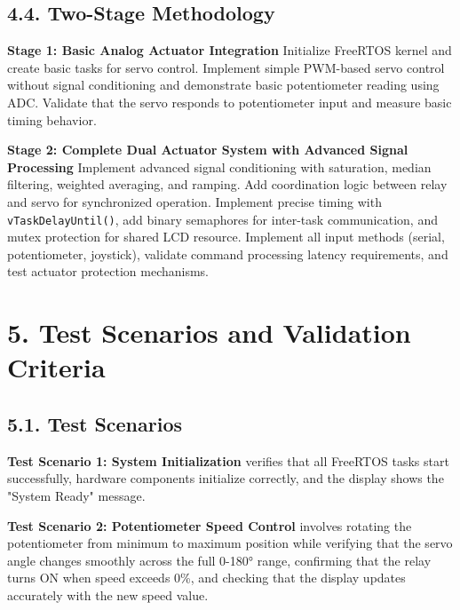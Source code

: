 \documentclass[12pt]{article}
\begin{document}
\subsection*{4.4. Two-Stage Methodology}

\textbf{Stage 1: Basic Analog Actuator Integration}
\newline
Initialize FreeRTOS kernel and create basic tasks for servo control. Implement simple PWM-based servo control without signal conditioning and demonstrate basic potentiometer reading using ADC. Validate that the servo responds to potentiometer input and measure basic timing behavior.

\textbf{Stage 2: Complete Dual Actuator System with Advanced Signal Processing}
\newline
Implement advanced signal conditioning with saturation, median filtering, weighted averaging, and ramping. Add coordination logic between relay and servo for synchronized operation. Implement precise timing with \texttt{vTaskDelayUntil()}, add binary semaphores for inter-task communication, and mutex protection for shared LCD resource. Implement all input methods (serial, potentiometer, joystick), validate command processing latency requirements, and test actuator protection mechanisms.

\section*{5. Test Scenarios and Validation Criteria}

\subsection*{5.1. Test Scenarios}

\textbf{Test Scenario 1: System Initialization} verifies that all FreeRTOS tasks start successfully, hardware components initialize correctly, and the display shows the "System Ready" message.

\textbf{Test Scenario 2: Potentiometer Speed Control} involves rotating the potentiometer from minimum to maximum position while verifying that the servo angle changes smoothly across the full 0-180° range, confirming that the relay turns ON when speed exceeds 0\%, and checking that the display updates accurately with the new speed value.
\end{document}
